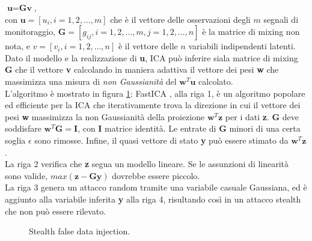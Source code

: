 \indent $\textbf{u} = \textbf{Gv}$,\\
con $\textbf{u} = [u_i, i = 1,2, \ldots, m]$ che è il vettore delle osservazioni degli $m$ segnali di monitoraggio, $\textbf{G} = [g_{ij}, i = 1, 2, \ldots,m, j = 1 ,2, \ldots, n]$ è la matrice di mixing non nota, e $v = [v_i, i = 1, 2, \ldots, n]$ è il vettore delle $n$ variabili indipendenti latenti.\\
Dato il modello e la realizzazione di \textbf{u}, ICA può inferire siala matrice di mixing \textbf{G} che il vettore \textbf{v} calcolando in maniera adattiva il vettore dei pesi \textbf{w} che massimizza una misura di \emph{non Gaussianità} del $\textbf{w}^T\textbf{u}$ calcolato.\\
L'algoritmo è mostrato in figura \ref{algo1}: FastICA \cite{lica}, alla riga 1, è un algoritmo popolare ed efficiente per la ICA che iterativamente trova la direzione in cui il vettore dei pesi \textbf{w} massimizza la non Gaussianità della proiezione $\textbf{w}^T\textbf{z}$ per i dati \textbf{z}. \textbf{G} deve soddisfare $\textbf{w}^T\textbf{G} = \textbf{I}$, con \textbf{I} matrice identità. Le entrate di \textbf{G} minori di una certa soglia $\epsilon$ sono rimosse. Infine, il quasi vettore di stato \textbf{y} può essere stimato da $\textbf{w}^T\textbf{z}$.\\
La riga 2 verifica che \textbf{z} segua un modello lineare. Se le assunzioni di linearità sono valide, $max(\textbf{z} - \textbf{Gy})$ dovrebbe essere piccolo.\\
La riga 3 genera un attacco random tramite una variabile casuale Gaussiana, ed è aggiunto alla variabile inferita \textbf{y} alla riga 4, risultando così in un attacco stealth che non può essere rilevato.
\begin{figure}[htbp]
	\centering
	\caption{Stealth false data injection.}
	\label{algo1}
\end{figure}	


